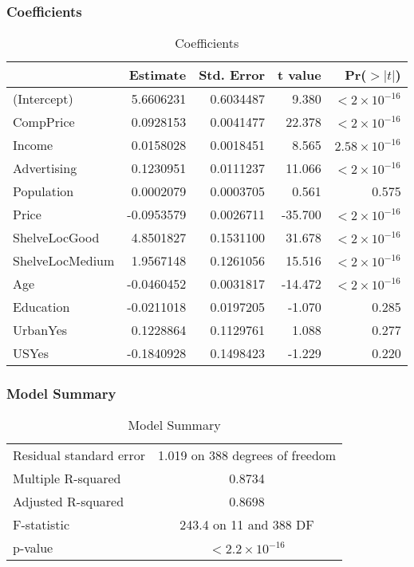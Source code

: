 \documentclass{article}
\theoremstyle{mytheoremstyle}
\theoremstyle{mytheoremstyle}
\theoremstyle{myproblemstyle}
\begin{document}
      \subsubsection{Coefficients}
      \begin{table}[H]
        \centering
        \begin{tabular}{lrrrr}
        \hline
        & Estimate & Std. Error & t value & Pr($>|t|$) \\ 
        \hline
          (Intercept) & 5.6606231 & 0.6034487 & 9.380 & $< 2 \times 10^{-16}$  \\ 
          CompPrice & 0.0928153 & 0.0041477 & 22.378 & $< 2 \times 10^{-16}$  \\ 
          Income & 0.0158028 & 0.0018451 & 8.565 & $2.58 \times 10^{-16}$  \\ 
          Advertising & 0.1230951 & 0.0111237 & 11.066 & $< 2 \times 10^{-16}$  \\ 
        Population & 0.0002079 & 0.0003705 & 0.561 & 0.575 \\ 
        Price & -0.0953579 & 0.0026711 & -35.700 & $< 2 \times 10^{-16}$  \\ 
        ShelveLocGood & 4.8501827 & 0.1531100 & 31.678 & $< 2 \times 10^{-16}$  \\ 
        ShelveLocMedium & 1.9567148 & 0.1261056 & 15.516 & $< 2 \times 10^{-16}$  \\ 
        Age & -0.0460452 & 0.0031817 & -14.472 & $< 2 \times 10^{-16}$  \\ 
        Education & -0.0211018 & 0.0197205 & -1.070 & 0.285 \\ 
        UrbanYes & 0.1228864 & 0.1129761 & 1.088 & 0.277 \\ 
        USYes & -0.1840928 & 0.1498423 & -1.229 & 0.220 \\ 
        \hline
        \end{tabular}
        \caption{Coefficients}
        \label{tab:coefficients_updated}
      \end{table}      
      \subsubsection{Model Summary} 
      \begin{table}[H]
          \centering
          \begin{tabular}{lc}
              \toprule
              Residual standard error & 1.019 on 388 degrees of freedom\\ 
              Multiple R-squared & 0.8734\\ 
              Adjusted R-squared & 0.8698\\ 
              F-statistic & 243.4 on 11 and 388 DF\\ 
              p-value & $< 2.2 \times 10^{-16}$ \\ %
              \bottomrule
          \end{tabular}
          \caption{Model Summary}
          \label{tab:model_summary}
      \end{table}
      \vspace{0.25in}
\end{document}
